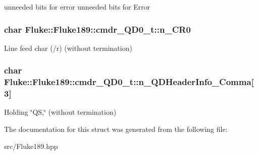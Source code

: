 unneeded bits for error unneeded bits for Error \hypertarget{structFluke_1_1Fluke189_1_1cmdr__QD0__t_a052cc7ae576b3634f2eb8e1a4587c29e}{
\subsubsection[{n\_\-CR0}]{\setlength{\rightskip}{0pt plus 5cm}char {\bf Fluke::Fluke189::cmdr\_\-QD0\_\-t::n\_\-CR0}}}
\label{structFluke_1_1Fluke189_1_1cmdr__QD0__t_a052cc7ae576b3634f2eb8e1a4587c29e}
Line feed char (/r) (without termination) \hypertarget{structFluke_1_1Fluke189_1_1cmdr__QD0__t_adbec2e8d0ea53d60baa33f2bad91e272}{
\subsubsection[{n\_\-QDHeaderInfo\_\-Comma}]{\setlength{\rightskip}{0pt plus 5cm}char {\bf Fluke::Fluke189::cmdr\_\-QD0\_\-t::n\_\-QDHeaderInfo\_\-Comma}\mbox{[}3\mbox{]}}}
\label{structFluke_1_1Fluke189_1_1cmdr__QD0__t_adbec2e8d0ea53d60baa33f2bad91e272}
Holding \char`\"{}QS,\char`\"{} (without termination) 

The documentation for this struct was generated from the following file:\begin{DoxyCompactItemize}
\item 
src/Fluke189.hpp\end{DoxyCompactItemize}
